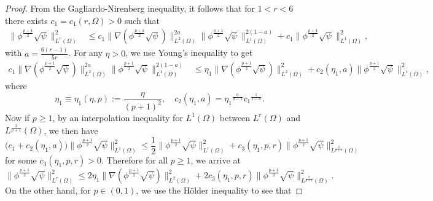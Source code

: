 \documentclass[12pt]{article}
\theoremstyle{plain}
\theoremstyle{definition}
\numberwithin{equation}{section}
\begin{document}
\begin{proof} From the Gagliardo-Nirenberg inequality,   it follows that for $1<r<6$ there exists $c_1=c_1(r,\Omega)>0$ such that
    \begin{align*}
      \|\phi^{\frac{p+1}{2}}\sqrt{\psi}\|^2_{L^{r}(\Omega)}&\leq c_1\|\nabla
      (\phi^{\frac{p+1}{2}}\sqrt{\psi})\|^{2a}_{L^{2}(\Omega)}\|\phi^{\frac{p+1}{2}}\sqrt{\psi}\|^{2(1-a)}_{L^{1}(\Omega)}
      +c_1\|\phi^{\frac{p+1}{2}}\sqrt{\psi}\|_{L^{1}(\Omega)}^2,
          \end{align*}
          with $a=\frac{6(r-1)}{5r}$.
          For any $\eta>0$,
    we use Young's inequality to get
    \begin{align*}
      c_1\|\nabla
      (\phi^{\frac{p+1}{2}}\sqrt{\psi})\|^{2a}_{L^{2}(\Omega)}
      \|\phi^{\frac{p+1}{2}}\sqrt{\psi}\|^{2(1-a)}_{L^{1}(\Omega)}
      &\leq \eta_1 \|\nabla (\phi^{\frac{p+1}{2}}\sqrt{\psi})\|_{L^{2}(\Omega)}^2
      +c_2(\eta_1,a)\|\phi^{\frac{p+1}{2}}\sqrt{\psi}\|_{L^{1}(\Omega)}^2,
    \end{align*}
    where
          \begin{equation}\label{3.1*}
          \eta_1\equiv\eta_1(\eta,p):=\frac{\eta}{(p+1)^2},\quad c_2(\eta_1,a)={\eta_1}^{\frac{a}{a-1}} {c_1}^{\frac{1}{1-a}}.
          \end{equation}
    Now if $p\geq 1$, by an interpolation inequality for $L^1(\Omega)$ between $L^r(\Omega)$ and $L^{\frac{2}{p+1}}(\Omega)$, we then have
         \begin{equation*}
         \big(c_1+c_2(\eta_1,a)\big)\|\phi^{\frac{p+1}{2}}\sqrt{\psi}\|_{L^{1}(\Omega)}^2\leq
    \frac{1}{2}\|\phi^{\frac{p+1}{2}}\sqrt{\psi}\|^2_{L^{r}(\Omega)}
    +c_3(\eta_1,p,r)\|\phi^{\frac{p+1}{2}}\sqrt{\psi}\|^2_{L^{\frac 2{p+1}}(\Omega)}\end{equation*}
    for some $c_3(\eta_1,p,r)>0$. %
      Therefore for all  $p\geq 1$, we arrive at
         \begin{equation}\label{3.2b}
         \|\phi^{\frac{p+1}{2}}\sqrt{\psi}\|^2_{L^{r}(\Omega)}\leq 2\eta_1 \|\nabla
    (\phi^{\frac{p+1}{2}}\sqrt{\psi})\|_{L^{2}(\Omega)}^2+2c_3(\eta_1,p,r)\|\phi^{\frac{p+1}{2}}\sqrt{\psi}\|^2_{L^{\frac{2}
    {p+1}}(\Omega)}.
    \end{equation}
   On the other hand, for $p\in(0,1)$, we use the H\"{o}lder inequality to  see  that

\end{proof}
\end{document}
